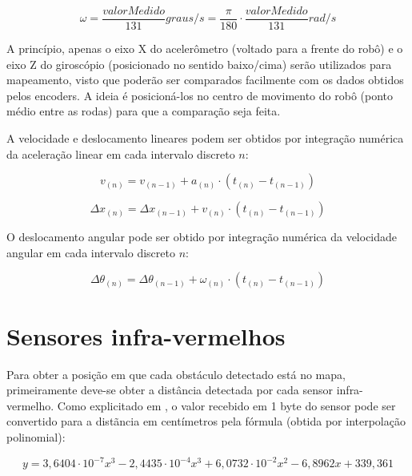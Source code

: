 \begin{equation}
  \omega = \frac{valorMedido}{131} \unit{graus/s} = \frac{\pi}{180} \cdot \frac{valorMedido}{131} \unit{rad/s}
  \label{eq:giro}
\end{equation}


A princípio, apenas o eixo X do acelerômetro (voltado para a frente do robô) e o eixo Z do giroscópio (posicionado no sentido baixo/cima) serão utilizados para mapeamento, visto que poderão ser comparados facilmente com os dados obtidos pelos encoders. A ideia é posicioná-los no centro de movimento do robô (ponto médio entre as rodas) para que a comparação seja feita.

A velocidade e deslocamento lineares podem ser obtidos por integração numérica da aceleração linear em cada intervalo discreto $n$:

\begin{equation}
  v_{(n)} = v_{(n - 1)} + a_{(n)} \cdot (t_{(n)} - t_{(n-1)})
  \label{eq:v_acel}
\end{equation}

\begin{equation}
  \Delta x_{(n)} = \Delta x_{(n - 1)} + v_{(n)} \cdot (t_{(n)} - t_{(n-1)})
  \label{eq:v_acel}
\end{equation}

O deslocamento angular pode ser obtido por integração numérica da velocidade angular em cada intervalo discreto $n$:

\begin{equation}
  \Delta \theta_{(n)} = \Delta \theta_{(n - 1)} + \omega_{(n)} \cdot (t_{(n)} - t_{(n-1)})
  \label{eq:v_acel}
\end{equation}



\section{Sensores infra-vermelhos}

Para obter a posição em que cada obstáculo detectado está no mapa, primeiramente deve-se obter a distância detectada por cada sensor infra-vermelho. Como explicitado em \cite{bellator_2012}, o valor recebido em 1 byte do sensor pode ser convertido para a distãncia em centímetros pela fórmula (obtida por interpolação polinomial):

\begin{equation}
  y = 3,6404 \cdot 10^{-7} x^3 - 2,4435 \cdot 10^{-4} x^3 + 6,0732 \cdot 10^{-2} x^2 - 6,8962 x + 339,361
  \label{eq:IR_dist}
\end{equation}


